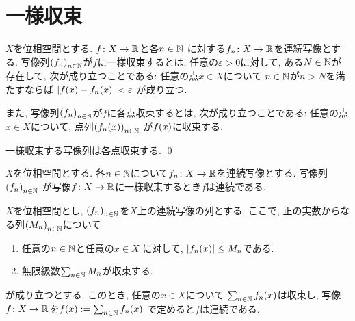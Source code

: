 \documentclass[uplatex, dvipdfmx, a4paper, 12pt, class=jsbook, crop=false]{standalone}
\begin{document}
\section{一様収束}
\label{sec:uniform-convergence}

\begin{definition}
	\( X \)を位相空間とする.
	\( f\colon X\to\mathbb{R} \)と各\( n \in \mathbb{N} \)
	に対する\( f_n\colon X\to\mathbb{R} \)を連続写像とする.
	写像列\( \lrparen{f_n}_{n \in \N} \)が\( f \)に一様収束するとは,
	任意の\( \varepsilon > 0 \)に対して,
	ある\( N \in \mathbb{N} \)が存在して,
	次が成り立つことである:
	任意の点\( x \in X \)について
	\( n \in \mathbb{N} \)が$ n > N $を満たすならば
	\( \abs{\mappt{f}{x} - \mappt{f_n}{x}} < \varepsilon \)
	が成り立つ.

	また, 写像列$ \lrparen{f_n}_{n \in \N} $が$ f $に各点収束するとは,
	次が成り立つことである:
	任意の点\( x \in X \)について,
	点列\( \lrparen{f_n(x)}_{n \in \N} \)
	が\( \mappt{f}{x} \)に収束する.
\end{definition}

\begin{proposition}
	\label{uc00001}
	一様収束する写像列は各点収束する.
	\qed
\end{proposition}

\begin{proposition}
	\label{uc00002}
	\( X \)を位相空間とする.
	各\( n \in \mathbb{N} \)について\( f_n\colon X\to\mathbb{R} \)を連続写像とする.
	写像列\( \lrparen{f_n}_{n \in \N} \)
	が写像\( f\colon X\to\mathbb{R} \)に一様収束するとき\( f \)は連続である.
\end{proposition}

\begin{theorem}
	\label{uc00003}
	\( X \)を位相空間とし,
	\( \lrparen{f_n}_{n \in \N} \)を\( X \)上の連続写像の列とする.
	ここで, 正の実数からなる列\( \lrparen{M_n}_{n \in \N} \)について
	\begin{enumerate}
		\item 任意の\( n \in \mathbb{N} \)と任意の\( x \in X \)
		に対して, \( \abs{\mappt{f_n}{x}} \leq M_n \)である.
		\item 無限級数\( \sum_{n \in \mathbb{N}} M_n \)が収束する.
	\end{enumerate}
	が成り立つとする.
	このとき, 任意の\( x \in X \)について
	\( \sum_{n \in \N} \mappt{f_n}{x} \)は収束し,
	写像\( f\colon X\to\mathbb{R} \)を\( \mappt{f}{x}
	\defeq \sum_{n \in \N} \mappt{f_n}{x} \)
	で定めると\( f \)は連続である.
\end{theorem}
\end{document}
